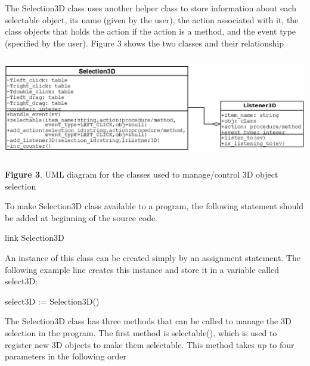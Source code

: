 \documentclass[letterpaper]{article}
\begin{document}
{\bigskip


\bigskip


\bigskip

The \textsf{Selection3D} class uses another helper class to store
information about each selectable object, its name (given by the
user), the action associated with it, the class objects that holds the
action if the action is a method, and the event type (specified by the
user). Figure 3 shows the two classes and their relationship

\bigskip

\begin{center}
\includegraphics[width=6in,height=1.75in]{utr9/utr9-img035.png}
\end{center}
\begin{center}
\begin{minipage}{5.1264in}
{
\textbf{Figure 3}. UML diagram for the classes used to manage/control 3D object selection}
\end{minipage}
\end{center}

\bigskip

To make Selection3D class available to a program, the following
statement should be added at beginning of the source code.


\bigskip

{\sffamily
link Selection3D}


\bigskip

An instance of this class can be created simply by an assignment
statement. The following example line creates this instance and store
it in a variable called \textsf{select3D:}

\bigskip

{\sffamily
select3D := Selection3D()}


\bigskip

The \textsf{Selection3D} class has three methods that can be called
to manage the 3D selection in the program. The first method is
\textsf{selectable()}, which is used to register new 3D objects to
make them selectable. This method takes up to four parameters in the
following order

}
\end{document}
